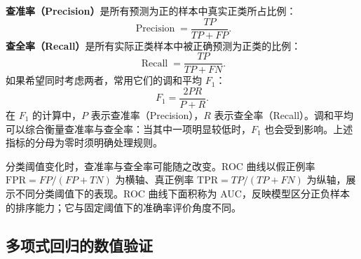 \textbf{查准率（Precision）}是所有预测为正的样本中真实正类所占比例：
\[
\operatorname{Precision}=\frac{TP}{TP+FP}.
\]
\textbf{查全率（Recall）}是所有实际正类样本中被正确预测为正类的比例：
\[
\operatorname{Recall}=\frac{TP}{TP+FN}.
\]
如果希望同时考虑两者，常用它们的调和平均 $F_1$：
\[
F_1=\frac{2PR}{P+R}.
\]
在 $F_1$ 的计算中，$P$ 表示查准率（Precision），$R$ 表示查全率（Recall）。调和平均可以综合衡量查准率与查全率：当其中一项明显较低时，$F_1$ 也会受到影响。上述指标的分母为零时须明确处理规则。

分类阈值变化时，查准率与查全率可能随之改变。ROC 曲线以假正例率 $\mathrm{FPR}=FP/(FP+TN)$ 为横轴、真正例率 $\mathrm{TPR}=TP/(TP+FN)$ 为纵轴，展示不同分类阈值下的表现。ROC 曲线下面积称为 AUC，反映模型区分正负样本的排序能力；它与固定阈值下的准确率评价角度不同。

\subsection{多项式回归的数值验证}


